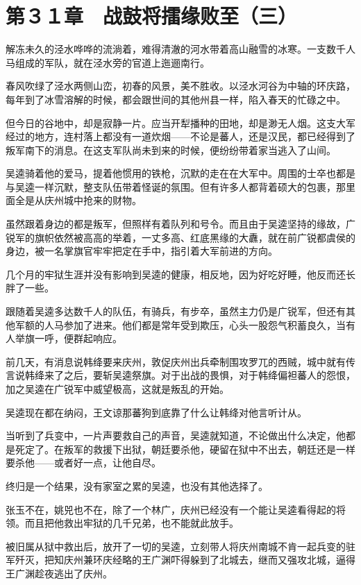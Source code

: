 \section{第３１章　战鼓将擂缘败至（三）}

解冻未久的泾水哗哗的流淌着，难得清澈的河水带着高山融雪的冰寒。一支数千人马组成的军队，就在泾水旁的官道上迤逦南行。

春风吹绿了泾水两侧山峦，初春的风景，美不胜收。以泾水河谷为中轴的环庆路，每年到了冰雪溶解的时候，都会跟世间的其他州县一样，陷入春天的忙碌之中。

但今日的谷地中，却是寂静一片。应当开犁播种的田地，却是渺无人烟。这支大军经过的地方，连村落上都没有一道炊烟——不论是蕃人，还是汉民，都已经得到了叛军南下的消息。在这支军队尚未到来的时候，便纷纷带着家当逃入了山间。

吴逵骑着他的爱马，提着他惯用的铁枪，沉默的走在在大军中。周围的士卒也都是与吴逵一样沉默，整支队伍带着怪诞的氛围。但有许多人都背着硕大的包裹，那里面全是从庆州城中抢来的财物。

虽然跟着身边的都是叛军，但照样有着队列和号令。而且由于吴逵坚持的缘故，广锐军的旗帜依然被高高的举着，一丈多高、红底黑缘的大纛，就在前广锐都虞侯的身边，被一名掌旗官牢牢把定在手中，指引着大军前进的方向。

几个月的牢狱生涯并没有影响到吴逵的健康，相反地，因为好吃好睡，他反而还长胖了一些。

跟随着吴逵多达数千人的队伍，有骑兵，有步卒，虽然主力仍是广锐军，但还有其他军额的人马参加了进来。他们都是常年受到欺压，心头一股怨气积蓄良久，当有人举旗一呼，便群起响应。

前几天，有消息说韩绛要来庆州，敦促庆州出兵牵制围攻罗兀的西贼，城中就有传言说韩绛来了之后，要斩吴逵祭旗。对于出战的畏惧，对于韩绛偏袒蕃人的怨恨，加之吴逵在广锐军中威望极高，这就是叛乱的开始。

吴逵现在都在纳闷，王文谅那蕃狗到底靠了什么让韩绛对他言听计从。

当听到了兵变中，一片声要救自己的声音，吴逵就知道，不论做出什么决定，他都是死定了。在叛军的救援下出狱，朝廷要杀他，硬留在狱中不出去，朝廷还是一样要杀他——或者好一点，让他自尽。

终归是一个结果，没有家室之累的吴逵，也没有其他选择了。

张玉不在，姚兕也不在，除了一个林广，庆州已经没有一个能让吴逵看得起的将领。而且把他救出牢狱的几千兄弟，也不能就此放手。

被旧属从狱中救出后，放开了一切的吴逵，立刻带人将庆州南城不肯一起兵变的驻军歼灭，把知庆州兼环庆经略的王广渊吓得躲到了北城去，继而又强攻北城，逼得王广渊趁夜逃出了庆州。

